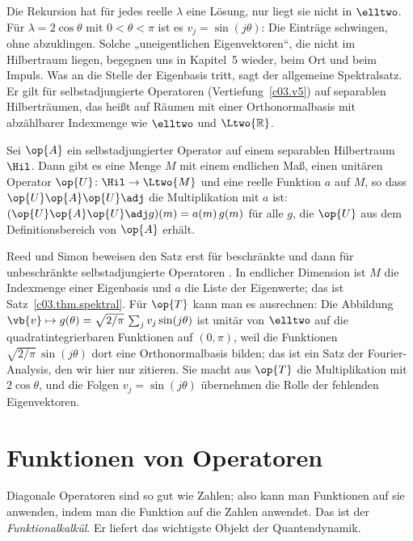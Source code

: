 \begin{vertiefung}
  Die Rekursion hat für jedes reelle $\lambda$ eine Lösung, nur liegt sie nicht in $\elltwo$.
  Für $\lambda = 2\cos\theta$ mit $0 < \theta < \pi$ ist es $v_j = \sin(j\theta)$: Die Einträge
  schwingen, ohne abzuklingen. Solche „uneigentlichen Eigenvektoren“, die nicht im Hilbertraum
  liegen, begegnen uns in Kapitel~5 wieder, beim Ort und beim Impuls. Was an die Stelle der
  Eigenbasis tritt, sagt der allgemeine Spektralsatz. Er gilt für selbstadjungierte Operatoren
  (Vertiefung~\ref{c03.v5}) auf separablen Hilberträumen, das heißt auf Räumen mit einer
  Orthonormalbasis mit abzählbarer Indexmenge wie $\elltwo$ und $\Ltwo{\mathbb{R}}$.

  \begin{theorem}\label{c03.thm.spektral-allgemein}
    Sei $\op{A}$ ein selbstadjungierter Operator auf einem separablen Hilbertraum $\Hil$. Dann
    gibt es eine Menge $M$ mit einem endlichen Maß, einen unitären Operator
    $\op{U}\colon \Hil \to \Ltwo{M}$ und eine reelle Funktion $a$ auf $M$, so dass
    $\op{U}\op{A}\op{U}\adj$ die Multiplikation mit $a$ ist: $(\op{U}\op{A}\op{U}\adj g)(m) = a(m)\, g(m)$
    für alle $g$, die $\op{U}$ aus dem Definitionsbereich von $\op{A}$ erhält.
  \end{theorem}

  Reed und Simon beweisen den Satz erst für beschränkte und dann für unbeschränkte
  selbstadjungierte Operatoren . In endlicher Dimension
  ist $M$ die Indexmenge einer Eigenbasis und $a$ die Liste der Eigenwerte; das ist
  Satz~\ref{c03.thm.spektral}. Für $\op{T}$ kann man es ausrechnen: Die Abbildung
  $\vb{v} \mapsto g(\theta) = \sqrt{2/\pi}\, \sum_j v_j \sin(j\theta)$ ist unitär von $\elltwo$ auf
  die quadratintegrierbaren Funktionen auf $(0, \pi)$, weil die Funktionen
  $\sqrt{2/\pi}\,\sin(j\theta)$ dort eine Orthonormalbasis bilden; das ist ein Satz der
  Fourier-Analysis, den wir hier nur zitieren. Sie macht aus $\op{T}$ die Multiplikation mit
  $2\cos\theta$, und die Folgen $v_j = \sin(j\theta)$ übernehmen die Rolle der fehlenden
  Eigenvektoren.
\end{vertiefung}

\section{Funktionen von Operatoren}\label{c03.s15}

Diagonale Operatoren sind so gut wie Zahlen; also kann man Funktionen auf sie anwenden, indem man
die Funktion auf die Zahlen anwendet. Das ist der \emph{Funktionalkalkül}. Er liefert das
wichtigste Objekt der Quantendynamik.

